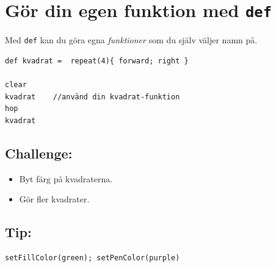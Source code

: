 \chapter{Gör din egen funktion med \lstinline{def}}Med \lstinline{def} kan du göra egna {\it funktioner} som du själv väljer namn på.

\begin{lstlisting}[basicstyle={\ttfamily\fontsize{20}{24}\selectfont},numbers=none]
def kvadrat =  repeat(4){ forward; right }  

clear
kvadrat    //använd din kvadrat-funktion
hop
kvadrat
\end{lstlisting}
        
\section*{\color{BrickRed}Challenge:}


\begin{itemize}

\item {Byt färg på kvadraterna.}
\item {Gör fler kvadrater.}

\end{itemize}


\section*{\color{OliveGreen}Tip:}

\begin{lstlisting}[numbers=none]
setFillColor(green); setPenColor(purple)
\end{lstlisting}
        

